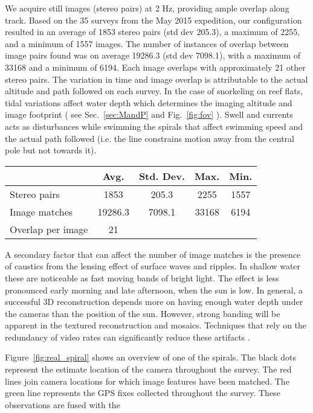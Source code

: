 We acquire still images (stereo pairs) at 2 Hz, providing ample overlap along track. Based on the 35 surveys from the May 2015 expedition, our configuration resulted in an average of 1853 stereo pairs (std dev 205.3), a maximum of 2255, and a minimum of 1557 images. The number of instances of overlap between image pairs found was on average 19286.3 (std dev 7098.1), with a maximum of 33168 and a minimum of 6194.  Each image overlaps with approximately 21 other stereo pairs. The variation in time and image overlap is attributable to the actual altitude and path followed on each survey. In the case of snorkeling on reef flats, tidal variations affect water depth which determines the imaging altitude and image footprint ( see Sec.~\ref{sec:MandP} and Fig.~\ref{fig:fov} ). Swell and currents acts as disturbances while swimming the spirals that affect swimming speed and the actual path followed (i.e. the line constrains motion away from the central pole but not towards it). 

\begin{table} \label{tab:imageStats}
    \begin{tabular}{|l|c|c|c|c|}
        \hline              & Avg. & Std. Dev. & Max. & Min. \\
        \hline Stereo pairs & 1853 & 205.3 & 2255 & 1557  \\ 
        Image matches & 19286.3 & 7098.1 & 33168 & 6194  \\ 
        Overlap per image & 21 & & & \\ 
    \end{tabular} 
\end{table}

A secondary factor that can affect the number of image matches is the presence of caustics from the lensing effect of surface waves and ripples. In shallow water these are noticeable as fast moving bands of bright light. The effect is less pronounced early morning and late afternoon, when the sun is low. In general, a successful 3D reconstruction depends more on having enough water depth under the cameras than the position of the sun. However, strong banding will be apparent in the textured reconstruction and mosaics. Techniques that rely on the redundancy of video rates can significantly reduce these artifacts \cite{Gracias_2008}.


Figure~\ref{fig:real_spiral} shows an overview of one of the spirals.  The black dots represent the estimate location of the camera throughout the survey.  The red lines join camera locations for which image features have been matched.  The green line represents the GPS fixes collected throughout the survey.  These observations are fused with the
